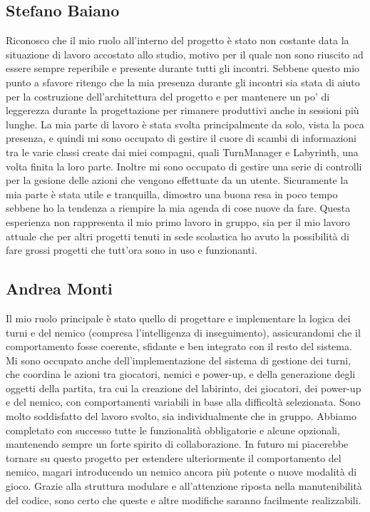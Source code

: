 \documentclass[a4paper,12pt]{report}
\begin{document}
\subsection{Stefano Baiano}
Riconosco che il mio ruolo all'interno del progetto è stato non costante data la situazione di lavoro accostato allo studio, motivo per il quale non sono riuscito 
ad essere sempre reperibile e presente durante tutti gli incontri. Sebbene questo mio punto a sfavore ritengo che la mia presenza durante gli incontri sia stata di 
aiuto per la costruzione dell'architettura del progetto e per mantenere un po' di leggerezza durante la progettazione per rimanere produttivi anche in sessioni più lunghe. 
La mia parte di lavoro è stata svolta principalmente da solo, vista la poca presenza, e quindi mi sono occupato di gestire il cuore di scambi di informazioni tra le varie classi 
create dai miei compagni, quali TurnManager e Labyrinth, una volta finita la loro parte. Inoltre mi sono occupato di gestire una serie di controlli per la gesione delle 
azioni che vengono effettuate da un utente. Sicuramente la mia parte è stata utile e tranquilla, dimostro una buona resa in poco tempo sebbene ho la tendenza a riempire 
la mia agenda di cose nuove da fare. Questa esperienza non rappresenta il mio primo lavoro in gruppo, sia per il mio lavoro attuale che per altri progetti tenuti in sede scolastica 
ho avuto la possibilità di fare grossi progetti che tutt'ora sono in uso e funzionanti.

\subsection{Andrea Monti}
Il mio ruolo principale è stato quello di progettare e implementare la logica dei turni e del nemico (compresa 
l’intelligenza di inseguimento), assicurandomi che il comportamento fosse coerente, sfidante e ben integrato con il 
resto del sistema. Mi sono occupato anche dell’implementazione del sistema di gestione dei turni, che coordina le azioni 
tra giocatori, nemici e power-up, e della generazione degli oggetti della partita, tra cui la creazione del labirinto, dei 
giocatori, dei power-up e del nemico, con comportamenti variabili in base alla difficoltà selezionata.
Sono molto soddisfatto del lavoro svolto, sia individualmente che in gruppo. Abbiamo completato con successo tutte le 
funzionalità obbligatorie e alcune opzionali, mantenendo sempre un forte spirito di collaborazione.
In futuro mi piacerebbe tornare su questo progetto per estendere ulteriormente il comportamento del nemico, 
magari introducendo un nemico ancora più potente o nuove modalità di gioco. Grazie alla struttura modulare e all’attenzione 
riposta nella manutenibilità del codice, sono certo che queste e altre modifiche saranno facilmente realizzabili.
\end{document}

